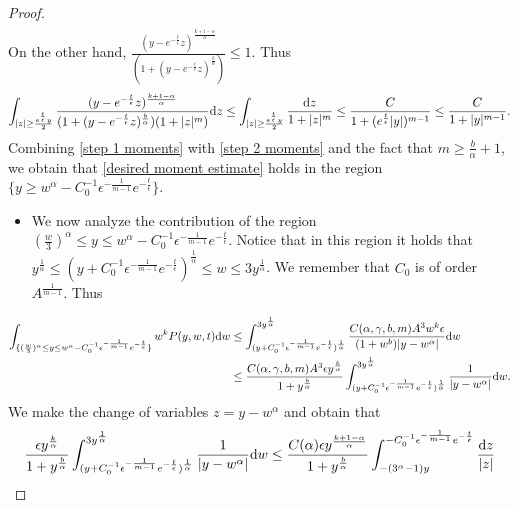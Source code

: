 \documentclass[11pt]{article}
\numberwithin{equation}{section}
\newcommand{\der}{\textup{d}}
\begin{document}
\begin{proof}
\begin{align}
 \end{align}
On the other hand, $\frac{(y-e^{-\frac{t}{\epsilon}}z)^{\frac{k+1-\alpha}{\alpha}}}{(1+(y-e^{-\frac{t}{\epsilon}}z)^{\frac{b}{\alpha}})}\leq 1$. Thus
\begin{align}\label{step 2 moments}
   \int_{ |z|\geq \frac{e^{\frac{t}{\epsilon}}y}{2}} \frac{(y-e^{-\frac{t}{\epsilon}}z)^{\frac{k+1-\alpha}{\alpha}}}{(1+(y-e^{-\frac{t}{\epsilon}}z)^{\frac{b}{\alpha}})(1+|z|^{m})}\der z\leq   \int_{ |z|\geq \frac{e^{\frac{t}{\epsilon}}y}{2}} \frac{\der z}{1+|z|^{m}}\leq \frac{C}{1+(e^{\frac{t}{\epsilon}}|y|)^{m-1}}\leq\frac{C}{1+|y|^{m-1}}.
\end{align}
Combining \eqref{step 1 moments} with \eqref{step 2 moments} and the fact that $m\geq \frac{b}{\alpha}+1$, we obtain that \eqref{desired moment estimate} holds in the region $\{y\geq w^{\alpha}-C_{0}^{-1}\epsilon^{-\frac{1}{m-1}} e^{-\frac{t}{\epsilon}}\}$.
\begin{itemize}
  \item  We now analyze the contribution of the region $(\frac{w}{3})^{\alpha}\leq y\leq w^{\alpha}-C_{0}^{-1}\epsilon^{-\frac{1}{m-1}}  e^{-\frac{t}{\epsilon}}$. Notice that in this region it holds that $y^{\frac{1}{\alpha}}\leq (y+C_{0}^{-1}\epsilon^{-\frac{1}{m-1}}  e^{-\frac{t}{\epsilon}})^{\frac{1}{\alpha}}\leq w\leq 3y^{\frac{1}{\alpha}}$. We remember that $C_{0}$ is of order $A^{\frac{1}{m-1}}$. Thus
\end{itemize} 
 \begin{align*}
      \int_{\{(\frac{w}{3})^{\alpha}\leq y\leq w^{\alpha}-C_{0}^{-1}\epsilon^{-\frac{1}{m-1}}  e^{-\frac{t}{\epsilon}}\}}w^{k}P(y,w,t)\der w&\leq \int^{3y^{\frac{1}{\alpha}}}_{(y+C_{0}^{-1}\epsilon^{-\frac{1}{m-1}}  e^{-\frac{t}{\epsilon}})^{\frac{1}{\alpha}}} \frac{C(\alpha,\gamma,b,m)A^{3}w^{k} \epsilon}{(1+w^{b})|y-w^{\alpha}|}\der w\\
      &\leq \frac{C(\alpha,\gamma,b,m)A^{3}\epsilon y^{\frac{k}{\alpha}}}{1+y^{\frac{b}{\alpha}}}\int^{3y^{\frac{1}{\alpha}}}_{(y+C_{0}^{-1}\epsilon^{-\frac{1}{m-1}}  e^{-\frac{t}{\epsilon}})^{\frac{1}{\alpha}}} \frac{1}{|y-w^{\alpha}|}\der w.
 \end{align*}
We make the change of variables $z=y-w^{\alpha}$ and obtain that 
\begin{align*}
  \frac{\epsilon y^{\frac{k}{\alpha}}}{1+y^{\frac{b}{\alpha}}}  \int^{3y^{\frac{1}{\alpha}}}_{(y+C_{0}^{-1}\epsilon^{-\frac{1}{m-1}}  e^{-\frac{t}{\epsilon}})^{\frac{1}{\alpha}}} \frac{1}{|y-w^{\alpha}|}\der w&\leq \frac{C(\alpha)\epsilon y^{\frac{k+1-\alpha}{\alpha}}}{1+y^{\frac{b}{\alpha}}}\int_{-(3^{\alpha}-1)y}^{-C_{0}^{-1}\epsilon^{-\frac{1}{m-1}}e^{-\frac{t}{\epsilon}}}\frac{\der z}{|z|}\\

\end{align*}
\end{proof}
\end{document}
